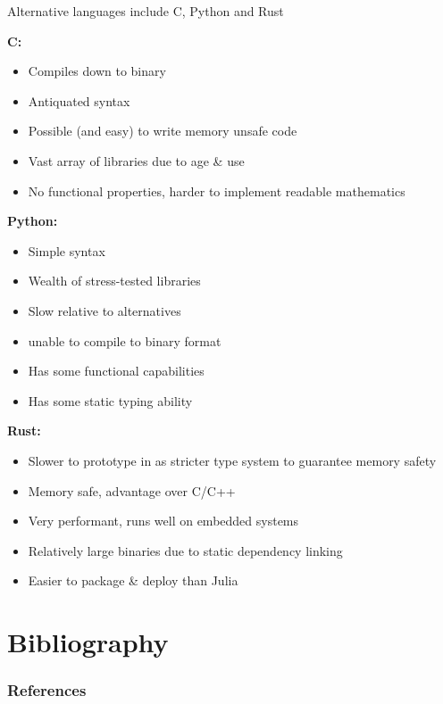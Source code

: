 \documentclass{beamer}
\begin{document}
\begin{frame}
Alternative languages include C, Python and Rust
\pause

\textbf{ C:}
\begin{itemize}
    \item Compiles down to binary
    \item Antiquated syntax
    \item Possible (and easy) to write memory unsafe code
    \item Vast array of libraries due to age \& use
    \item No functional properties, harder to implement readable mathematics
\end{itemize}
\pause
\textbf{Python:}
\begin{itemize}
    \item Simple syntax
    \item Wealth of stress-tested libraries
    \item Slow relative to alternatives
    \item unable to compile to binary format
    \item Has some functional capabilities
    \item Has some static typing ability
\end{itemize}
\pause
\end{frame}
\begin{frame}
\textbf{Rust:}
\begin{itemize}
    \item Slower to prototype in as stricter type system to guarantee memory safety
    \item Memory safe, advantage over C/C++
    \item Very performant, runs well on embedded systems
    \item Relatively large binaries due to static dependency linking
    \item Easier to package \& deploy than Julia
\end{itemize}
\end{frame}

\section{Bibliography}
\begin{frame}[allowframebreaks]
\frametitle{References}


\end{frame}
\end{document}
